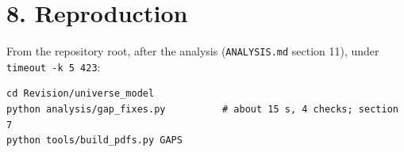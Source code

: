 \documentclass[11pt]{article}
\begin{document}
\section*{8. Reproduction}

From the repository root, after the analysis (\texttt{ANALYSIS.\allowbreak{}md} section 11), under \texttt{timeout -{}\allowbreak{}k 5 423}:

\begin{Verbatim}[fontsize=\small]
cd Revision/universe_model
python analysis/gap_fixes.py          # about 15 s, 4 checks; section 7
python tools/build_pdfs.py GAPS
\end{Verbatim}
\end{document}

